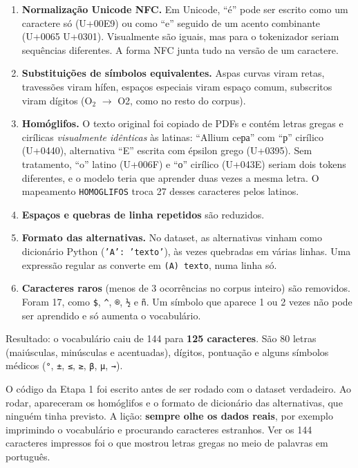\documentclass[11pt,a4paper]{article}
\begin{document}
\begin{enumerate}
\item \textbf{Normalização Unicode NFC.} Em Unicode, ``é'' pode ser escrito como um caractere só (U+00E9) ou como ``e'' seguido de um acento combinante (U+0065 U+0301). Visualmente são iguais, mas para o tokenizador seriam sequências diferentes. A forma NFC junta tudo na versão de um caractere.
\item \textbf{Substituições de símbolos equivalentes.} Aspas curvas viram retas, travessões viram hífen, espaços especiais viram espaço comum, subscritos viram dígitos (O$_2$ $\to$ O2, como no resto do corpus).
\item \textbf{Homóglifos.} O texto original foi copiado de PDFs e contém letras gregas e cirílicas \emph{visualmente idênticas} às latinas: ``Allium ceра'' com ``р'' cirílico (U+0440), alternativa ``Ε'' escrita com épsilon grego (U+0395). Sem tratamento, ``o'' latino (U+006F) e ``о'' cirílico (U+043E) seriam dois tokens diferentes, e o modelo teria que aprender duas vezes a mesma letra. O mapeamento \texttt{HOMOGLIFOS} troca 27 desses caracteres pelos latinos.
\item \textbf{Espaços e quebras de linha repetidos} são reduzidos.
\item \textbf{Formato das alternativas.} No dataset, as alternativas vinham como dicionário Python (\texttt{'A': 'texto'}), às vezes quebradas em várias linhas. Uma expressão regular as converte em \texttt{(A) texto}, numa linha só.
\item \textbf{Caracteres raros} (menos de 3 ocorrências no corpus inteiro) são removidos. Foram 17, como \texttt{\$}, \texttt{\textasciicircum}, \texttt{®}, \texttt{½} e \texttt{ñ}. Um símbolo que aparece 1 ou 2 vezes não pode ser aprendido e só aumenta o vocabulário.
\end{enumerate}

Resultado: o vocabulário caiu de 144 para \textbf{125 caracteres}. São 80 letras (maiúsculas, minúsculas e acentuadas), dígitos, pontuação e alguns símbolos médicos (\texttt{°}, \texttt{±}, \texttt{≤}, \texttt{≥}, \texttt{β}, \texttt{μ}, \texttt{→}).

\begin{atencao}
O código da Etapa 1 foi escrito antes de ser rodado com o dataset verdadeiro. Ao rodar, apareceram os homóglifos e o formato de dicionário das alternativas, que ninguém tinha previsto. A lição: \textbf{sempre olhe os dados reais}, por exemplo imprimindo o vocabulário e procurando caracteres estranhos. Ver os 144 caracteres impressos foi o que mostrou letras gregas no meio de palavras em português.
\end{atencao}
\end{document}
